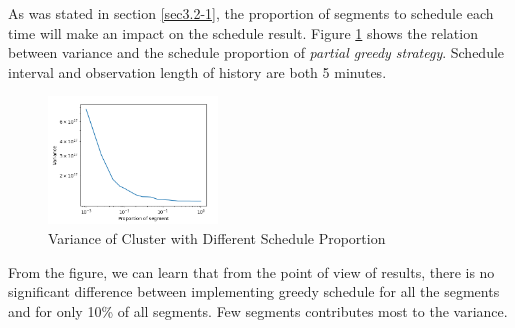 \documentclass[letterpaper,twocolumn,10pt]{article}
\begin{document}
As was stated in section \ref{sec3.2-1}, the proportion
of segments to schedule each time will make an impact on
the schedule result. Figure \ref{fig3.2-3} shows the
relation between variance and the schedule proportion of \textit{partial greedy strategy}. Schedule interval and
observation length of history are both 5 minutes.

\begin{figure}[h]
    \centering
    \includegraphics[width=0.4\textwidth]{Figure-3.2/Figure_3.png}
    \caption{Variance of Cluster with Different Schedule  Proportion}
    \label{fig3.2-3}
\end{figure}
From the figure, we can learn that from the point of view 
of results, there is no significant difference between
implementing greedy schedule for all the segments and for 
only 10\% of all segments. Few segments contributes most to
the variance.









\end{document}
